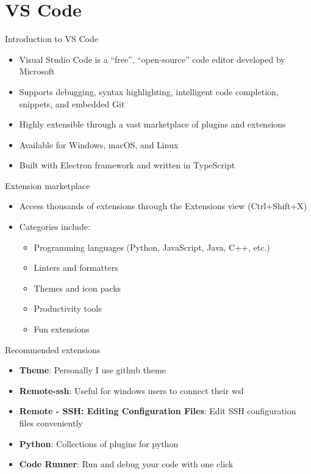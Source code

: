 \section{VS Code}

\begin{frame}[fragile]{Introduction to VS Code}
	\begin{itemize}
		\item Visual Studio Code is a ``free'', ``open-source'' code editor developed by Microsoft
		\item Supports debugging, syntax highlighting, intelligent code completion, snippets, and embedded Git
		\item Highly extensible through a vast marketplace of plugins and extensions
		\item Available for Windows, macOS, and Linux
		\item Built with Electron framework and written in TypeScript
	\end{itemize}
\end{frame}

\begin{frame}[fragile]{Extension marketplace}
	\begin{itemize}
		\item Access thousands of extensions through the Extensions view (Ctrl+Shift+X)
		\item Categories include:
		\begin{itemize}
			\item Programming languages (Python, JavaScript, Java, C++, etc.)
			\item Linters and formatters
			\item Themes and icon packs
			\item Productivity tools
			\item Fun extensions
		\end{itemize}
	\end{itemize}
\end{frame}

\begin{frame}[fragile]{Recommended extensions}
	\begin{itemize}
		\item \textbf{Theme}: Personally I use github theme
		\item \textbf{Remote-ssh}: Useful for windows users to connect their wsl
		\item \textbf{Remote - SSH: Editing Configuration Files}: Edit SSH configuration files conveniently
		\item \textbf{Python}: Collections of plugins for python
		\item \textbf{Code Runner}: Run and debug your code with one click
	\end{itemize}
\end{frame}

